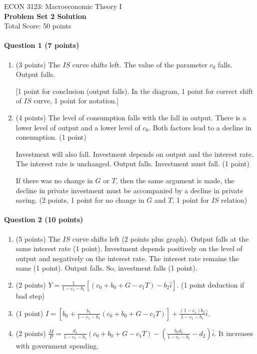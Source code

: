 \documentclass[12pt]{article}
\begin{document}
\begin{center}
    ECON 3123: Macroeconomic Theory I\\
    {\large \textbf{Problem Set 2 Solution}}\\
    Total Score: 50 points
\end{center}

\paragraph{Question 1 (7 points)}
\begin{enumerate}[label=\alph*.]
    \item (3 points) The $IS$ curve shifts left. The value of the parameter $c_0$ falls. Output falls.
    
    [1 point for conclusion (output falls). In the diagram, 1 point for correct shift of $IS$ curve, 1 point for notation.]
    \item (4 points) The level of consumption falls with the fall in output. There is a lower level of output and a lower level of $c_0$. Both factors lead to a decline in consumption. (1 point)
    
    Investment will also fall. Investment depends on output and the interest rate. The interest rate is unchanged. Output falls. Investment must fall. (1 point)

    If there was no change in $G$ or $T$, then the same argument is made, the decline in private investment must be accompanied by a decline in private saving. (2 points, 1 point for no change in $G$ and $T$, 1 point for $IS$ relation)
\end{enumerate}

\paragraph{Question 2 (10 points)}
\begin{enumerate}[label=\alph*.]
    \item (5 points) The $IS$ curve shifts left (2 points plus graph).  Output falls at the same interest rate (1 point). Investment depends positively on the level of output and negatively on the interest rate. The interest rate remains the same (1 point). Output falls. So, investment falls (1 point).
    \item (2 points) $Y = \frac{1}{1-c_1-b_1}[(c_0+b_0+G-c_1T)-b_2\bar{i}]$. (1 point deduction if bad step)
    \item (1 point) $I = \left[b_0 + \frac{b_1}{1-c_1-b_1}(c_0+b_0+G-c_1T)\right]+\frac{(1-c_1)b_2}{1-c_1-b_1}\bar{i}$.
    \item (2 points) $\frac{M}{P} = \frac{d_1}{1-c_1-b_1}(c_0+b_0+G-c_1T)-\left(\frac{b_2d_1}{1-c_1-b_1}-d_2\right)\bar{i}$. It increases with government spending.
\end{enumerate}
\end{document}
